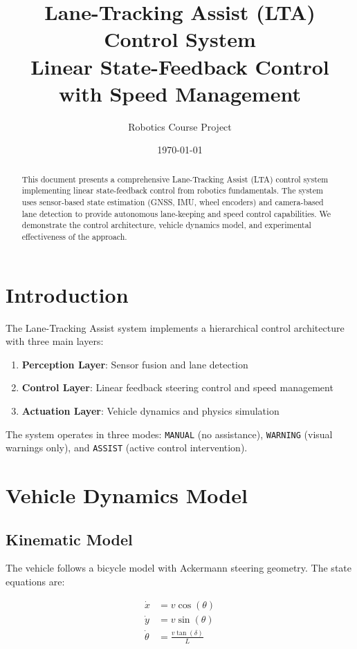 \documentclass[11pt,a4paper]{article}
\title{Lane-Tracking Assist (LTA) Control System\\
\large Linear State-Feedback Control with Speed Management}
\author{Robotics Course Project}
\date{\today}
\begin{document}
\maketitle

\begin{abstract}
This document presents a comprehensive Lane-Tracking Assist (LTA) control system implementing linear state-feedback control from robotics fundamentals. The system uses sensor-based state estimation (GNSS, IMU, wheel encoders) and camera-based lane detection to provide autonomous lane-keeping and speed control capabilities. We demonstrate the control architecture, vehicle dynamics model, and experimental effectiveness of the approach.
\end{abstract}

\section{Introduction}

The Lane-Tracking Assist system implements a hierarchical control architecture with three main layers:
\begin{enumerate}
    \item \textbf{Perception Layer}: Sensor fusion and lane detection
    \item \textbf{Control Layer}: Linear feedback steering control and speed management
    \item \textbf{Actuation Layer}: Vehicle dynamics and physics simulation
\end{enumerate}

The system operates in three modes: \texttt{MANUAL} (no assistance), \texttt{WARNING} (visual warnings only), and \texttt{ASSIST} (active control intervention).

\section{Vehicle Dynamics Model}

\subsection{Kinematic Model}

The vehicle follows a bicycle model with Ackermann steering geometry. The state equations are:

\begin{align}
\dot{x} &= v \cos(\theta) \\
\dot{y} &= v \sin(\theta) \\
\dot{\theta} &= \frac{v \tan(\delta)}{L}
\end{align}
\end{document}
